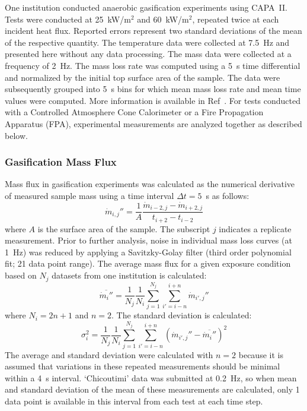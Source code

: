 \documentclass{book}
\begin{document}
One institution conducted anaerobic gasification experiments using CAPA~II. Tests were conducted at 25~kW/m$^2$ and 60~kW/m$^2$, repeated twice at each incident heat flux. Reported errors represent two standard deviations of the mean of the respective quantity. The temperature data were collected at 7.5~Hz and presented here without any data processing. The mass data were collected at a frequency of 2~Hz. The mass loss rate was computed using a 5~s time differential and normalized by the initial top surface area of the sample. The data were subsequently grouped into 5~s bins for which mean mass loss rate and mean time values were computed. More information is available in Ref~\cite{fiola2020comparison}. For tests conducted with a Controlled Atmosphere Cone Calorimeter or a Fire Propagation Apparatus (FPA), experimental measurements are analyzed together as described below.

\subsubsection{Gasification Mass Flux}

Mass flux in gasification experiments was calculated as the numerical derivative of measured sample mass using a time interval $\Delta t=5$~s as follows:
\begin{equation}
   \dot{m}_{i,j}'' = \frac{1}{A} \frac{\dot{m}_{i-2,j}-\dot{m}_{i+2,j}}{t_{i+2}-t_{i-2}}
\end{equation}
where $A$ is the surface area of the sample. The subscript $j$ indicates a replicate measurement. Prior to further analysis, noise in individual mass loss curves (at 1~Hz) was reduced by applying a Savitzky-Golay filter (third order polynomial fit; 21 data point range). The average mass flux for a given exposure condition based on $N_j$ datasets from one institution is calculated:
\begin{equation}
   \overline{\dot{m}_i''} = \frac{1}{N_j} \frac{1}{N_i} \sum_{j=1}^{N_j} \sum_{i'=i-n}^{i+n} \dot{m}_{i',j}''
\end{equation}
where $N_i=2n+1$ and $n=2$. The standard deviation is calculated:
\begin{equation}
   \sigma_i^2 = \frac{1}{N_j} \frac{1}{N_i} \sum_{j=1}^{N_j} \sum_{i'=i-n}^{i+n} \left( \dot{m}_{i',j}'' - \overline{\dot{m}_i''} \right)^2
\end{equation}
The average and standard deviation were calculated with $n=2$ because it is assumed that variations in these repeated measurements should be minimal within a 4~s interval. `Chicoutimi' data was submitted at 0.2~Hz, so when mean and standard deviation of the mean of these measurements are calculated, only 1 data point is available in this interval from each test at each time step.
\end{document}
